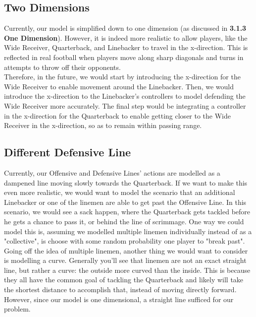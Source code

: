 \subsection{Two Dimensions}

\quad Currently, our model is simplified down to one dimension (as discussed in \textbf{3.1.3 One Dimension}). However, it is indeed more realistic to allow players, like the Wide Receiver, Quarterback, and Linebacker to travel in the x-direction. This is reflected in real football when players move along sharp diagonals and turns in attempts to throw off their opponents. \\

Therefore, in the future, we would start by introducing the x-direction for the Wide Receiver to enable movement around the Linebacker. Then, we would introduce the x-direction to the Linebacker’s controllers to model defending the Wide Receiver more accurately. The final step would be integrating a controller in the x-direction for the Quarterback to enable getting closer to the Wide Receiver in the x-direction, so as to remain within passing range.

\subsection{Different Defensive Line}

\quad Currently, our Offensive and Defensive Lines' actions are modelled as a dampened line moving slowly towards the Quarterback. If we want to make this even more realistic, we would want to model the scenario that an additional Linebacker or one of the linemen are able to get past the Offensive Line. In this scenario, we would see a sack happen, where the Quarterback gets tackled before he gets a chance to pass it, or behind the line of scrimmage. One way we could model this is, assuming we modelled multiple linemen individually instead of as a "collective", is choose with some random probability one player to "break past". \\

Going off the idea of multiple linemen, another thing we would want to consider is modelling a curve. Generally you'll see that linemen are not an exact straight line, but rather a curve: the outside more curved than the inside. This is because they all have the common goal of tackling the Quarterback and likely will take the shortest distance to accomplish that, instead of moving directly forward. However, since our model is one dimensional, a straight line sufficed for our problem.